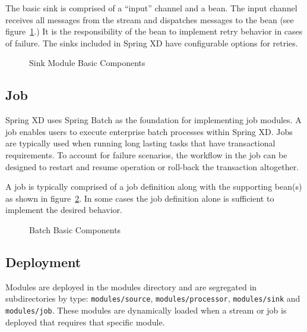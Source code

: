 \par

The basic sink is comprised of a ``input'' channel and a bean.
The input channel receives all messages from the stream and dispatches
messages to the bean (see figure~\ref{fig:sinkmbc}.) It is the responsibility 
of the bean to implement retry behavior in cases of failure. The sinks 
included in Spring XD have configurable options for retries.

\par

\begin{figure}
\centering
{}
\caption{Sink Module Basic Components}
\label{fig:sinkmbc}
\end{figure}

\par

\subsection{Job}
\label{sec:Job}
Spring XD uses Spring Batch \cite{spring-batch-reference} as the foundation for implementing
job modules. A job enables users to execute enterprise batch processes within Spring XD.
Jobs are typically used when running long lasting tasks that have transactional requirements.
To account for failure scenarios, the workflow in the job can be designed to restart and 
resume operation or roll-back the transaction altogether.

\par

A job is typically comprised of a job definition along with the supporting
bean(s) as shown in figure~\ref{fig:batchmbc}.
In some cases the job definition alone is sufficient to implement the desired behavior.

\par

\begin{figure}
\centering
{}
\caption{Batch Basic Components}
\label{fig:batchmbc}
\end{figure}

\par 

\subsection{Deployment}
Modules are deployed in the modules directory and are segregated in
subdirectories by type: \texttt{modules/source}, \texttt{modules/processor}, 
\texttt{modules/sink} and \texttt{modules/job}.
These modules are dynamically loaded when a stream or job is deployed that requires that
specific module.

